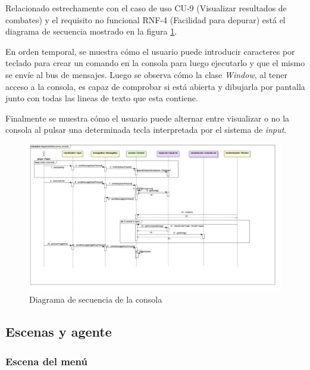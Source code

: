 Relacionado estrechamente con el caso de uso CU-9 (Visualizar resultados de combates) y el requisito no funcional RNF-4 (Facilidad para depurar) está el diagrama de secuencia mostrado en la figura \ref{sec:console}.

\bigskip

En orden temporal, se muestra cómo el usuario puede introducir caracteres por teclado para crear un comando en la consola para luego ejecutarlo y que el mismo se envíe al bus de mensajes. Luego se observa cómo la clase \textit{Window}, al tener acceso a la consola, es capaz de comprobar si está abierta y dibujarla por pantalla junto con todas las lineas de texto que esta contiene.

\bigskip

Finalmente se muestra cómo el usuario puede alternar entre visualizar o no la consola al pulsar una determinada tecla interpretada por el sistema de \textit{input}.

\begin{landscape}
\begin{figure}
	\hspace*{-3cm}  
	\includegraphics[width=24cm]{otros/UML/png/alld/png/CasosDeUso__Especifico__Collaboration4__Interaction1__diagramaDeSecuencia_consola_20.png}
	\caption{Diagrama de secuencia de la consola}
	\label{sec:console}
\end{figure}
\end{landscape}


\subsection{Escenas y agente}

\subsubsection*{Escena del menú}


